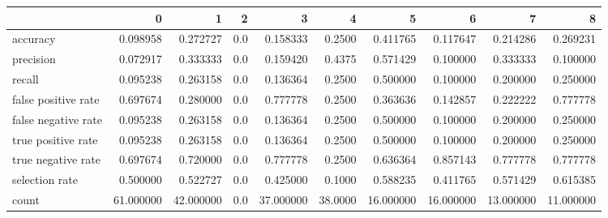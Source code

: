 \begin{tabular}{lrrrrrrrrr}
\toprule
{} &          0 &          1 &    2 &          3 &        4 &          5 &          6 &          7 &          8 \\
\midrule
accuracy            &   0.098958 &   0.272727 &  0.0 &   0.158333 &   0.2500 &   0.411765 &   0.117647 &   0.214286 &   0.269231 \\
precision           &   0.072917 &   0.333333 &  0.0 &   0.159420 &   0.4375 &   0.571429 &   0.100000 &   0.333333 &   0.100000 \\
recall              &   0.095238 &   0.263158 &  0.0 &   0.136364 &   0.2500 &   0.500000 &   0.100000 &   0.200000 &   0.250000 \\
false positive rate &   0.697674 &   0.280000 &  0.0 &   0.777778 &   0.2500 &   0.363636 &   0.142857 &   0.222222 &   0.777778 \\
false negative rate &   0.095238 &   0.263158 &  0.0 &   0.136364 &   0.2500 &   0.500000 &   0.100000 &   0.200000 &   0.250000 \\
true positive rate  &   0.095238 &   0.263158 &  0.0 &   0.136364 &   0.2500 &   0.500000 &   0.100000 &   0.200000 &   0.250000 \\
true negative rate  &   0.697674 &   0.720000 &  0.0 &   0.777778 &   0.2500 &   0.636364 &   0.857143 &   0.777778 &   0.777778 \\
selection rate      &   0.500000 &   0.522727 &  0.0 &   0.425000 &   0.1000 &   0.588235 &   0.411765 &   0.571429 &   0.615385 \\
count               &  61.000000 &  42.000000 &  0.0 &  37.000000 &  38.0000 &  16.000000 &  16.000000 &  13.000000 &  11.000000 \\
\bottomrule
\end{tabular}
